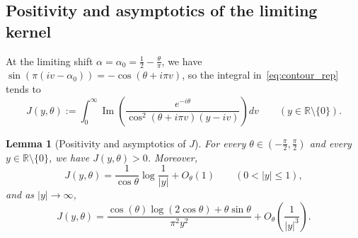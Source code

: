 \documentclass[11pt,a4paper]{amsart}
\newtheorem{lemma}[theorem]{Lemma}
\theoremstyle{remark}
\numberwithin{equation}{section}
\newcommand{\R}{\mathbb{R}}
\begin{document}
\subsection{Positivity and asymptotics of the limiting kernel}
At the limiting shift $\alpha = \alpha_0 = \frac{1}{2}-\frac{\theta}{\pi}$, we have $\sin(\pi(iv-\alpha_0)) = -\cos(\theta+i\pi v)$, so the integral in~\eqref{eq:contour_rep} tends to
\begin{equation}\label{eq:J_def}
  J(y,\theta) := \int_0^\infty \operatorname{Im}\!\left(\frac{e^{-i\theta}}{\cos^2(\theta+i\pi v)(y-iv)}\right)dv \qquad (y \in \R\setminus\{0\}).
\end{equation}

\begin{lemma}[Positivity and asymptotics of $J$]\label{lem:J_pos}
For every $\theta \in (-\frac{\pi}{2},\frac{\pi}{2})$ and every $y \in \R\setminus\{0\}$, we have $J(y,\theta) > 0$. Moreover,
\begin{equation}\label{eq:J_zero}
  J(y,\theta) = \frac{1}{\cos\theta}\log\frac{1}{|y|} + O_\theta(1) \qquad (0 < |y| \le 1),
\end{equation}
and as $|y| \to \infty$,
\begin{equation}\label{eq:J_inf}
  J(y,\theta) = \frac{\cos(\theta)\log(2\cos\theta) + \theta\sin\theta}{\pi^2 y^2} + O_\theta\!\left(\frac{1}{|y|^3}\right).
\end{equation}
\end{lemma}
\end{document}
